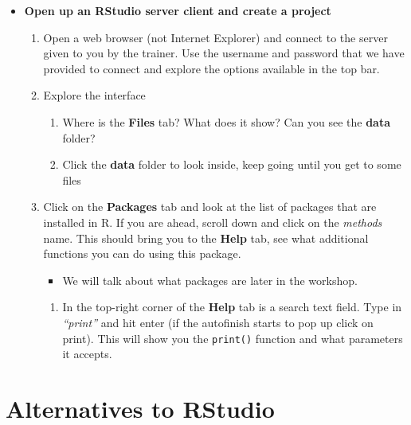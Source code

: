 \documentclass[a4paper]{book}
\providecommand{\tightlist}{%
  \setlength{\itemsep}{0pt}\setlength{\parskip}{0pt}}
\newenvironment{rmdblock}[1]
  {\vspace{1.5em}\begin{shaded*}
  \begin{itemize}
  \renewcommand{\labelitemi}{
    \raisebox{-.7\height}[0pt][0pt]{
      {\setkeys{Gin}{width=3em,keepaspectratio}\texttt{[image: images/\#1]}}
    }
  }
  \item
  }
  {
  \end{itemize}
  \end{shaded*}
  }
\newenvironment{rmdexercise}
  {\begin{rmdblock}{exercise}}
  {\end{rmdblock}}
\begin{document}
\begin{rmdexercise}
\textbf{Open up an RStudio server client and create a project}

\begin{enumerate}
\def\labelenumi{\arabic{enumi}.}
\item
  Open a web browser (not Internet Explorer) and connect to the server
  given to you by the trainer. Use the username and password that we
  have provided to connect and explore the options available in the top
  bar.
\item
  Explore the interface

  \begin{enumerate}
  \def\labelenumii{\alph{enumii})}
  \tightlist
  \item
    Where is the \textbf{Files} tab? What does it show? Can you see the
    \textbf{data} folder?
  \item
    Click the \textbf{data} folder to look inside, keep going until you
    get to some files
  \end{enumerate}
\item
  Click on the \textbf{Packages} tab and look at the list of packages
  that are installed in R. If you are ahead, scroll down and click on
  the \emph{methods} name. This should bring you to the \textbf{Help}
  tab, see what additional functions you can do using this package.

  \begin{itemize}
  \tightlist
  \item
    We will talk about what packages are later in the workshop.
  \end{itemize}

  \begin{enumerate}
  \def\labelenumii{\alph{enumii})}
  \tightlist
  \item
    In the top-right corner of the \textbf{Help} tab is a search text
    field. Type in \emph{``print''} and hit enter (if the autofinish
    starts to pop up click on print). This will show you the
    \texttt{print()} function and what parameters it accepts.
  \end{enumerate}
\end{enumerate}
\end{rmdexercise}

\section{Alternatives to RStudio}\label{alternatives-to-rstudio}
\end{document}
